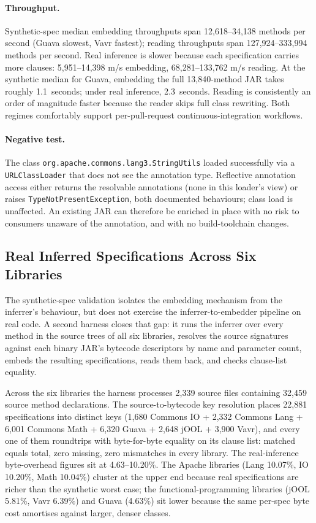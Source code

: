 \paragraph{Throughput.}
Synthetic-spec median embedding throughputs span 12{,}618--34{,}138 methods per
second (Guava slowest, Vavr fastest); reading throughputs span
127{,}924--333{,}994 methods per second. Real inference is slower because each
specification carries more clauses: 5{,}951--14{,}398 m/s embedding,
68{,}281--133{,}762 m/s reading. At the synthetic median for Guava, embedding the
full 13{,}840-method JAR takes roughly 1.1~seconds; under real inference,
2.3~seconds. Reading is consistently an order of magnitude faster because the
reader skips full class rewriting. Both regimes comfortably support
per-pull-request continuous-integration workflows.

\paragraph{Negative test.}
The class \texttt{org.apache.commons.lang3.StringUtils} loaded successfully via a
\texttt{URLClassLoader} that does not see the annotation type. Reflective
annotation access either returns the resolvable annotations (none in this
loader's view) or raises \texttt{TypeNotPresentException}, both documented
behaviours; class load is unaffected. An existing JAR can therefore be enriched
in place with no risk to consumers unaware of the annotation, and with no
build-toolchain changes.

\subsection{Real Inferred Specifications Across Six Libraries}
\label{subsec:a2-real-inference}

The synthetic-spec validation isolates the embedding mechanism from the
inferrer's behaviour, but does not exercise the inferrer-to-embedder pipeline on
real code. A second harness closes that gap: it runs the inferrer over every
method in the source trees of all six libraries, resolves the source signatures
against each binary JAR's bytecode descriptors by name and parameter count,
embeds the resulting specifications, reads them back, and checks clause-list
equality.

Across the six libraries the harness processes 2{,}339 source files containing
32{,}459 source method declarations. The source-to-bytecode key resolution
places 22{,}881 specifications into distinct keys (1{,}680 Commons IO + 2{,}332
Commons Lang + 6{,}001 Commons Math + 6{,}320 Guava + 2{,}648 jOOL + 3{,}900
Vavr), and every one of them roundtrips with byte-for-byte equality on its clause
list: matched equals total, zero missing, zero mismatches in every library. The
real-inference byte-overhead figures sit at 4.63--10.20\%. The Apache libraries
(Lang 10.07\%, IO 10.20\%, Math 10.04\%) cluster at the upper end because real
specifications are richer than the synthetic worst case; the
functional-programming libraries (jOOL 5.81\%, Vavr 6.39\%) and Guava (4.63\%)
sit lower because the same per-spec byte cost amortises against larger, denser
classes.

